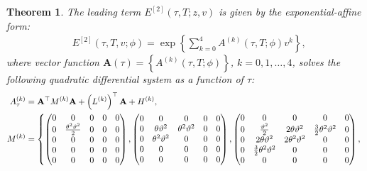 \documentclass[pdftex,11pt,a4paper] {article}
\newtheorem{theorem}{Theorem}[section]
\begin{document}
\begin{theorem}
The leading term $E^{[2]}(\tau,T;z,v)$ is given by the exponential-affine form: 
\begin{equation}\label{eq:aff_expan_ord2_lead}
\begin{split}
& E^{[2]}(\tau,T,v; \phi)= \exp \left\{\sum^{4}_{k=0}A^{(k)}(\tau,T;\phi)v^{k}  \right\},
\end{split}
\end{equation}
where vector function $\mathbf{A}(\tau)=\left\{A^{(k)}(\tau,T;\phi)\right\}$, $k=0,1,\ldots,4$, solves the following quadratic differential system as a function of $\tau$:
\begin{equation}\label{eq:OrigMGFLogAndQVSecondOrder}
\begin{split}
A^{(k)}_\tau&=\mathbf{A}^\top M^{(k)}\mathbf{A} + \left(L^{(k)}\right)^\top \mathbf{A} + H^{(k)},\\
M^{(k)}&=\left\{
\begin{pmatrix} %
0 & 0 & 0 & 0 & 0 \\
0 & \frac{\theta^2\vartheta^2}{2} & 0 & 0 & 0 \\
0 & 0 & 0 & 0 & 0 \\
0 & 0 & 0 & 0 & 0 \\
0 & 0 & 0 & 0 & 0 \\
\end{pmatrix}, 
\begin{pmatrix} %
0 & 0 & 0 & 0 & 0 \\
0 & \theta\vartheta^2 & \theta^2\vartheta^2 & 0 & 0 \\
0 & \theta^2\vartheta^2 & 0 & 0 & 0 \\
0 & 0 & 0 & 0 & 0 \\
0 & 0 & 0 & 0 & 0 \\
\end{pmatrix}, 
\begin{pmatrix} %
0 & 0 & 0 & 0 & 0 \\
0 & \frac{\vartheta^2}{2}& 2\theta\vartheta^2 & \frac{3}{2}\theta^2\vartheta^2 & 0 \\
0 &  2\theta\vartheta^2  & 2\theta^2\vartheta^2 & 0 & 0 \\
0 & \frac{3}{2}\theta^2\vartheta^2 & 0 & 0 & 0 \\
0 & 0 & 0 & 0 & 0 \\
\end{pmatrix},\right.\vspace*{-1\baselineskip}
\end{split}
\end{equation}
\begin{equation*}

\end{equation*}
\end{theorem}
\end{document}

